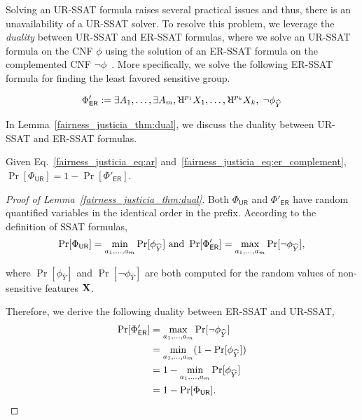 Solving an UR-SSAT formula raises several practical issues and thus, there is an unavailability of a UR-SSAT solver. To resolve this problem, we leverage the \textit{duality} between UR-SSAT  and ER-SSAT formulas, where we solve an UR-SSAT formula on the CNF $ \phi $ using the solution of an ER-SSAT formula on the complemented CNF $ \neg \phi $~\cite{littman2001stochastic}. More specifically, we solve the following ER-SSAT formula for finding the least favored sensitive group.

\begin{equation}
	\Phi'_{\mathsf{ER}} := \exists A_1,\dots, \exists A_{\numsensitive},
	\R^{p_{1}}X_1, \dots, \R^{p_{\numnonsensitive}}X_{\numnonsensitive},   \; \neg \phi_{\widehat{Y}}
	\label{fairness_justicia_eq:er_complement}
\end{equation}


In Lemma~\ref{fairness_justicia_thm:dual}, we discuss the duality between UR-SSAT and ER-SSAT formulas.


\begin{lemma}\label{fairness_justicia_thm:dual}
Given Eq.~\eqref{fairness_justicia_eq:ar} and~\eqref{fairness_justicia_eq:er_complement},	$ \Pr[\Phi_{\mathsf{UR}}] = 1 - \Pr[\Phi'_{\mathsf{ER}}]  $.
\end{lemma}

\begin{proof}[Proof of Lemma~\ref{fairness_justicia_thm:dual}]
	Both $ \Phi_{\mathsf{UR}} $ and $ \Phi'_{\mathsf{ER}} $ have  random quantified variables in the identical order in the prefix. According to the definition of SSAT formulas,
	\begin{equation*}
	\Pr[\Phi_{\mathsf{UR}}] = \min\limits_{a_1, \dots,a_{m}} \Pr[\phi_{\widehat{Y}}] \text{ and } \Pr[\Phi'_{\mathsf{ER}}] = \max\limits_{a_1, \dots,a_{m}} \Pr[\neg\phi_{\widehat{Y}}],
	\end{equation*}
	
	where $ \Pr[\phi_{\widehat{Y}}] $ and $ \Pr[\neg \phi_{\widehat{Y}}] $ are both computed for the random values of non-sensitive features $ \mathbf{X} $.
	
	Therefore, we derive the following duality between ER-SSAT and UR-SSAT,
	\begin{equation}
	\begin{split}
	\Pr[\Phi'_{\mathsf{ER}}] &= \max\limits_{a_1, \dots,a_{m}} \Pr[\neg\phi_{\widehat{Y}}]  \\
	&= \min\limits_{a_1, \dots,a_{m}} (1 - \Pr[\phi_{\widehat{Y}}])\\
	&= 1 - \min\limits_{a_1, \dots,a_{m}}  \Pr[\phi_{\widehat{Y}}]\\
	&= 1 - \Pr[\Phi_{\mathsf{UR}}].\notag
	\end{split}
	\end{equation}
\end{proof}


